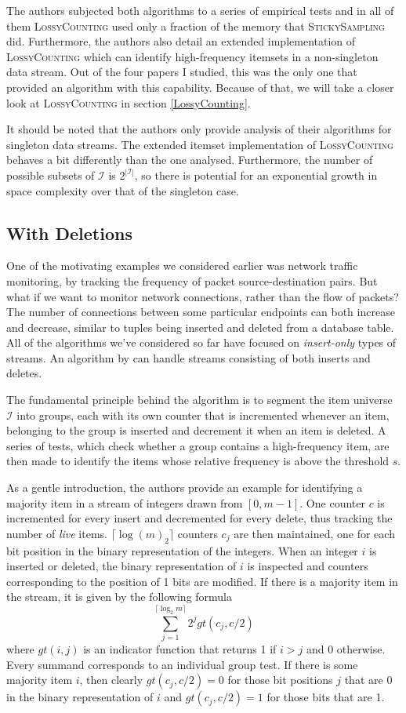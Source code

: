 \documentclass[a4paper]{article}
\begin{document}
The authors subjected both algorithms to a series of empirical tests and in all of them \textsc{LossyCounting} used only a fraction of the memory that  \textsc{StickySampling} did. Furthermore, the authors also detail an extended implementation of \textsc{LossyCounting} which can identify high-frequency itemsets in a non-singleton data stream. Out of the four papers I studied, this was the only one that provided an algorithm with this capability. Because of that, we will take a closer look at \textsc{LossyCounting} in section \ref{LossyCounting}.

It should be noted that the authors only provide analysis of their algorithms for singleton data streams. The extended itemset implementation of \textsc{LossyCounting} behaves a bit differently than the one analysed. Furthermore, the number of possible subsets of $\mathcal{I}$ is $2^{|\mathcal{I}|}$, so there is potential for an exponential growth in space complexity over that of the singleton case.

\subsection{With Deletions}
One of the motivating examples we considered earlier was network traffic monitoring, by tracking the frequency of packet source-destination pairs. But what if we want to monitor network connections, rather than the flow of packets? The number of connections between some particular endpoints can both increase and decrease, similar to tuples being inserted and deleted from a database table. All of the algorithms we've considered so far have focused on \textit{insert-only} types of streams. An algorithm by \cite{Cormode:2003:WHW:773153.773182} can handle streams consisting of both inserts and deletes.

The fundamental principle behind the algorithm is to segment the item universe $\mathcal{I}$ into groups, each with its own counter that is incremented whenever an item, belonging to the group is inserted and decrement it when an item is deleted. A series of tests, which check whether a group contains a high-frequency item, are then made to identify the items whose relative frequency is above the threshold $s$.

As a gentle introduction, the authors provide an example for identifying a majority item in a stream of integers drawn from $[0, m-1]$. One counter $c$ is incremented for every insert and decremented for every delete, thus tracking the number of \textit{live} items. $\lceil \log(m)_2 \rceil$ counters $c_j$ are then maintained, one for each bit position in the binary representation of the integers. When an integer $i$ is inserted or deleted, the binary representation of $i$ is inspected and counters corresponding to the position of 1 bits are modified. If there is a majority item in the stream, it is given by the following formula
$$
\sum_{j=1}^{\lceil \log_2 m \rceil} 2^j gt(c_j, c/2)
$$
where $gt(i, j)$ is an indicator function that returns 1 if $i > j$ and 0 otherwise. Every summand corresponds to an individual group test. If there is some majority item $i$, then clearly $gt(c_j, c/2) = 0$ for those bit positions $j$ that are 0 in the binary representation of $i$ and $gt(c_j, c/2) = 1$ for those bits that are 1.
\end{document}
